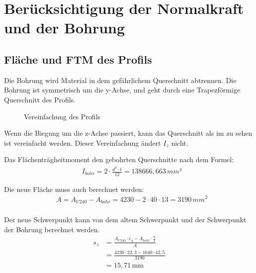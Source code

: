 \section{Berücksichtigung der Normalkraft und der Bohrung}
\subsection{Fläche und FTM des Profils}
Die Bohrung wird Material in dem gefährlichem Querschnitt abtrennen. Die Bohrung ist symmetrisch um die y-Achse, und geht durch eine Trapezförmige Querschnitt des Profils.

\begin{figure}[H]
  \centering
  \caption{Vereinfachung des Profils}
  \label{fig:trapezinrechteck}
\end{figure}
Wenn die Biegung um die z-Achse passiert, kann das Querschnitt als im  zu sehen ist vereinfacht werden. Dieser Vereinfachung ändert $I_z$ nicht.

Das Flächenträgheitmoment den gebohrten Querschnitte nach dem Formel:
\begin{align*}
  &I_{bohr} = 2 \cdot \frac{d^3 \cdot t}{12} = 138666,663 \, mm^4
\end{align*}

Die neue Fläche muss auch berechnet werden:
\begin{align*}
  &A = A_{U240} - A_{bohr} = 4230 - 2 \cdot 40 \cdot 13 = 3190 \, mm^2 \\
\end{align*}

Der neue Schwerpunkt kann von dem altem Schwerpunkt und der Schwerpunkt der Bohrung berechnet werden.
\begin{align*}
  s_z &= \frac{A_{U240} \cdot e_y - A_{bohr} \cdot \frac{b}{2}}{A} \\
  &= \frac{4230 \cdot 22{,}3 - 1040 \cdot 42{,}5}{3190} \\
  &= 15{,}71 \, \text{mm}
\end{align*}


